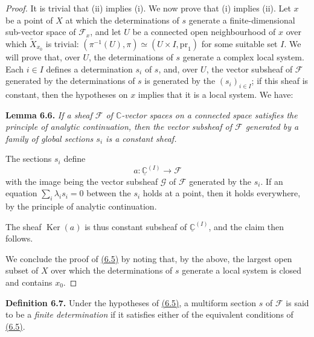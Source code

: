 \documentclass{report}
\newenvironment{itenv}[1]
  {\phantomsection\par\medskip\noindent\textbf{#1.}\itshape}
  {\par\medskip}
\newenvironment{rmenv}[1]
  {\phantomsection\par\medskip\noindent\textbf{#1.}\rmfamily}
  {\par\medskip}
\newcommand{\scr}[1]{{\mathscr{#1}}}
\newcommand{\CC}{\mathbb{C}}
\newcommand{\pr}{\mathrm{pr}}
\DeclareMathOperator{\Ker}{Ker}
\newcommand{\oldpage}[1]{\marginpar{\footnotesize$\Big\vert$ \textit{p.~#1}}}
\begin{document}
\oldpage{38}
\begin{proof}
  It is trivial that (ii) implies (i).
  We now prove that (i) implies (ii).
  Let $x$ be a point of $X$ at which the determinations of $s$ generate a finite-dimensional sub-vector space of $\scr{F}_x$, and let $U$ be a connected open neighbourhood of $x$ over which $\widetilde{X}_{x_0}$ is trivial: $(\pi^{-1}(U),\pi) \simeq (U\times I,\pr_1)$ for some suitable set $I$.
  We will prove that, over $U$, the determinations of $s$ generate a complex local system.
  Each $i\in I$ defines a determination $s_i$ of $s$, and, over $U$, the vector subsheaf of $\scr{F}$ generated by the determinations of $s$ is generated by the $(s_i)_{i\in I}$;
  if this sheaf is constant, then the hypotheses on $x$ implies that it is a local system.
  We have:

  \begin{itenv}{Lemma 6.6}
  \label{I.6.6}
    If a sheaf $\scr{F}$ of $\CC$-vector spaces on a connected space satisfies the principle of analytic continuation, then the vector subsheaf of $\scr{F}$ generated by a family of global sections $s_i$ is a constant sheaf.
  \end{itenv}

  The sections $s_i$ define
  \[
    a\colon\underline{\CC}^{(I)}\to\scr{F}
  \]
  with the image being the vector subsheaf $\scr{G}$ of $\scr{F}$ generated by the $s_i$.
  If an equation $\sum_i\lambda_i s_i=0$ between the $s_i$ holds at a point, then it holds everywhere, by the principle of analytic continuation.

  The sheaf $\Ker(a)$ is thus constant subsheaf of $\underline{\CC}^{(I)}$, and the claim then follows.

  We conclude the proof of \hyperref[I.6.5]{(6.5)} by noting that, by the above, the largest open subset of $X$ over which the determinations of $s$ generate a local system is closed and contains $x_0$.
\end{proof}

\begin{rmenv}{Definition 6.7}
\label{I.6.7}
  Under the hypotheses of \hyperref[I.6.5]{(6.5)}, a multiform section $s$ of $\scr{F}$ is said to be a \emph{finite determination} if it satisfies either of the equivalent conditions of \hyperref[I.6.5]{(6.5)}.
\end{rmenv}
\end{document}
